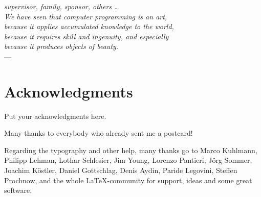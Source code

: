 \thispagestyle{empty}
\begin{flushright}{\slshape%
	supervisor, family, sponsor, others \ldots \\
    We have seen that computer programming is an art, \\ 
    because it applies accumulated knowledge to the world, \\ 
    because it requires skill and ingenuity, and especially \\
    because it produces objects of beauty.} \\ \medskip
    ---  \citep{knuth:1974}
\end{flushright}



\bigskip

\begingroup
\let\clearpage\relax
\let\cleardoublepage\relax
\let\cleardoublepage\relax
\section*{Acknowledgments}
Put your acknowledgments here.

Many thanks to everybody who already sent me a postcard!

Regarding the typography and other help, many thanks go to Marco 
Kuhlmann, Philipp Lehman, Lothar Schlesier, Jim Young, Lorenzo 
Pantieri, J\"org Sommer, Joachim K\"ostler, Daniel 
Gottschlag, Denis Aydin, Paride Legovini, Steffen Prochnow, 
and the whole \LaTeX-community for support, ideas and some great 
software.

\endgroup



